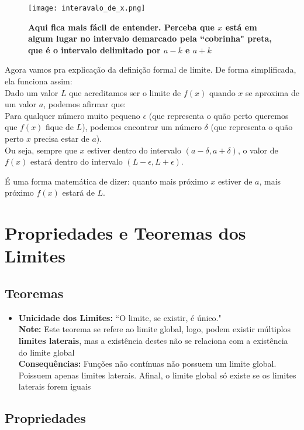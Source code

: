 \documentclass{article}
\begin{document}
\begin{figure}[h]
    \centering
    \texttt{[image: interavalo\_de\_x.png]}
    \caption{\textbf{Aqui fica mais fácil de entender. Perceba que $x$ está em algum lugar no intervalo demarcado pela ``cobrinha" preta, que é o intervalo delimitado por $a - k$ e $a + k$}}
\end{figure}
\noindent Agora vamos pra explicação da definição formal de limite. De forma simplificada, ela funciona assim:
\\[10pt]
Dado um valor \(L\) que acreditamos ser o limite de \(f(x)\) quando \(x\) se aproxima de um valor \(a\), podemos afirmar que:
\\[10pt]
Para qualquer número muito pequeno \(\epsilon\) (que representa o quão perto queremos que \(f(x)\) fique de \(L\)), podemos encontrar um número \(\delta\) (que representa o quão perto \(x\) precisa estar de \(a\)).
\\[10pt]
Ou seja, sempre que \(x\) estiver dentro do intervalo \((a - \delta, a + \delta)\), o valor de \(f(x)\) estará dentro do intervalo \((L - \epsilon, L + \epsilon)\).

É uma forma matemática de dizer: quanto mais próximo \(x\) estiver de \(a\), mais próximo \(f(x)\) estará de \(L\).

\section{Propriedades e Teoremas dos Limites}

\subsection{Teoremas}

\begin{itemize}
\item \textbf{Unicidade dos Limites:} ``O limite, se existir, é único."\\
\textbf{Note:} Este teorema se refere ao limite global, logo, podem existir múltiplos \textbf{limites laterais}, mas a existência destes não se relaciona com a existência do limite global\\[10pt]
\textbf{Consequências:} Funções não contínuas não possuem um limite global. Poissuem apenas limites laterais. Afinal, o limite global só existe se os limites laterais forem iguais

\end{itemize}

\subsection{Propriedades}
\end{document}
